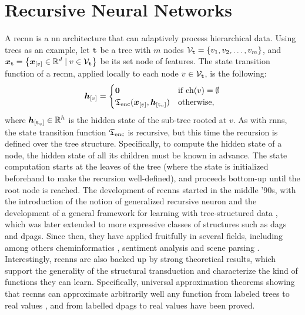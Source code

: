 \begin{figure*}[h!]
    \centering
    \resizebox{.7\textwidth}{!}{}
    \caption{The teacher forcing strategy for training a sequence generator with RNNs.}
    \label{fig:teacher-forcing}
\end{figure*}

\section{Recursive Neural Networks} \label{sec:recnns}
A \gls{recnn} \citep{sperduti1997generalizedneuron,frasconi1998general} is a \gls{nn} architecture that can adaptively process hierarchical data. Using trees as an example, let $\mathtt{t}$ be a tree with $m$ nodes $\Nodes{t} = \Set{v_1, v_2, \ldots, v_m}$, and $\Vector{x}_{\Tree{t}} = \Set{\Elem{x}{v} \in \Real^d \mid v \in \Nodes{t}}$ be its set node of features. The state transition function of a \gls{recnn}, applied locally to each node $v \in \Nodes{t}$, is the following:
\begin{align*}
    \Elem{h}{v}=
    \begin{cases}
        \boldsymbol{0} & \mathrm{if}\; \Fun{ch}(v) = \emptyset\\
        \EncTrans(\Elem{x}{v}, \Elem{h}{\Tree{t}_v}) & \mathrm{otherwise},
    \end{cases}
\end{align*}
where $\Elem{h}{\Tree{t}_v} \in \Real^h$ is the hidden state of the sub-tree rooted at $v$. As with \glspl{rnn}, the state transition function $\mathfrak{T}_{\mathrm{enc}}$ is recursive, but this time the recursion is defined over the tree structure. Specifically, to compute the hidden state of a node, the hidden state of all its children must be known in advance. The state computation starts at the leaves of the tree (where the state is initialized beforehand to make the recursion well-defined), and proceeds bottom-up until the root node is reached.
The development of \glspl{recnn} started in the middle '90s, with the introduction of the notion of generalized recursive neuron \citep{sperduti1997generalizedneuron} and the development of a general framework for learning with tree-structured data \citep{frasconi1998general}, which was later extended to more expressive classes of structures such as \glspl{dag} and \glspl{dpag}. Since then, they have applied fruitfully in several fields, including among others cheminformatics \citep{micheli2007introductionrecnncheminformatics}, sentiment analysis \citep{socher2013recnnsentiment} and scene parsing \citep{socher2011parsingscenes}. Interestingly, \glspl{recnn} are also backed up by strong theoretical results, which support the generality of the structural transduction and characterize the kind of functions they can learn. Specifically, universal approximation theorems showing that \glspl{recnn} can approximate arbitrarily well any function from labeled trees to real values \citep{hammer1999recnn}, and from labelled \glspl{dpag} to real values \citep{hammer2005universal} have been proved.

